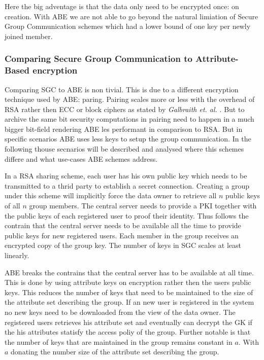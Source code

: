 Here the big adventage is that the data only need to be encrypted once: on creation. With \ac{ABE} we are not able to go beyond the natural limiation of Secure Group Communication schemes which had a lower bound of one key per newly joined member.  

\subsubsection{Comparing Secure Group Communication to Attribute-Based encryption}
Comparing \ac{SGC} to \ac{ABE} is non tivial. This is due to a different encryption technique used by \ac{ABE}: paring. Pairing scales more or less with the overhead of \ac{RSA} rather then \ac{ECC} or block ciphers as stated by \textit{Galbraith et. al.} \cite{galbraith2008pairings}. But to archive the same bit security computations in pairing need to happen in a much bigger bit-field rendering \ac{ABE} les performant in comparison to \ac{RSA}. But in specific scenarios \ac{ABE} uses less keys to setup the group communication. In the following thouse secnarios will be described and analysed where this schemes differe and what use-cases \ac{ABE} schemes address.

In a \ac{RSA} sharing scheme, each user has his own public key which needs to be transmitted to a thrid party to establish a secret connection. Creating a group under this scheme will implicitly force the data owner to retrieve all $n$ public keys of all $n$ group members. The central server needs to provide a \ac{PKI} together with the public keys of each registered user to proof their identity. Thus follows the contrain that the central server needs to be available all the time to provide public keys for new registered users. Each member in the group receives an encrypted copy of the group key. The number of keys in \ac{SGC} scales at least linearly. 

\ac{ABE} breaks the contrains that the central server has to be available at all time. This is done by using attribute keys on encryption rather then the users public keys. This reduces the number of keys that need to be maintained to the size of the attribute set describing the group. If an new user is registered in the system no new keys need to be downloaded from the view of the data owner. The registered users retrieves his attribute set and eventually can decrypt the \ac{GK} if the his attributes statisfy the access poliy of the group. Further notable is that the number of keys that are maintained in the group remains constant in $a$. With $a$ donating the number size of the attribute set describing the group. 

